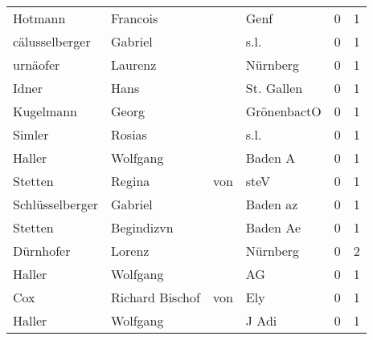 \begin{center}
\begin{tiny}
\begin{longtabu}{llllrr}
                  Hotmann &                           Francois &             &                                        Genf &          0 &         1 \\
           cälusselberger &                            Gabriel &             &                                        s.l. &          0 &         1 \\
                 urnäofer &                            Laurenz &             &                                    Nürnberg &          0 &         1 \\
                    Idner &                               Hans &             &                                  St. Gallen &          0 &         1 \\
                Kugelmann &                              Georg &             &                                 GrönenbactO &          0 &         1 \\
                   Simler &                             Rosias &             &                                        s.l. &          0 &         1 \\
                   Haller &                           Wolfgang &             &                                     Baden A &          0 &         1 \\
                  Stetten &                             Regina &         von &                                        steV &          0 &         1 \\
          Schlüsselberger &                            Gabriel &             &                                    Baden az &          0 &         1 \\
                  Stetten &                         Begindizvn &             &                                    Baden Ae &          0 &         1 \\
                Dürnhofer &                             Lorenz &             &                                    Nürnberg &          0 &         2 \\
                   Haller &                           Wolfgang &             &                                          AG &          0 &         1 \\
                      Cox &                    Richard Bischof &         von &                                         Ely &          0 &         1 \\
                   Haller &                           Wolfgang &             &                                       J Adi &          0 &         1 \\

\end{longtabu}
\end{tiny}
\end{center}
